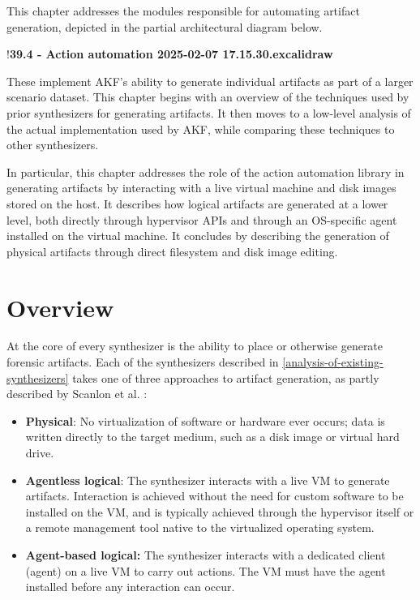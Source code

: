 This chapter addresses the modules responsible for automating artifact
generation, depicted in the partial architectural diagram below.

!\textbf{39.4 - Action automation 2025-02-07 17.15.30.excalidraw}

These implement AKF's ability to generate individual artifacts as part
of a larger scenario dataset. This chapter begins with an overview of
the techniques used by prior synthesizers for generating artifacts. It
then moves to a low-level analysis of the actual implementation used by
AKF, while comparing these techniques to other synthesizers.

In particular, this chapter addresses the role of the action automation
library in generating artifacts by interacting with a live virtual
machine and disk images stored on the host. It describes how logical
artifacts are generated at a lower level, both directly through
hypervisor APIs and through an OS-specific agent installed on the
virtual machine. It concludes by describing the generation of physical
artifacts through direct filesystem and disk image editing.

\section{Overview}\label{overview}

At the core of every synthesizer is the ability to place or otherwise
generate forensic artifacts. Each of the synthesizers described in
\autoref{analysis-of-existing-synthesizers} takes one of three approaches to artifact generation, as
partly described by Scanlon et al.
\cite{scanlonEviPlantEfficientDigital2017}:

\begin{itemize}
\tightlist
\item
  \textbf{Physical}: No virtualization of software or hardware ever
  occurs; data is written directly to the target medium, such as a disk
  image or virtual hard drive.
\item
  \textbf{Agentless logical}: The synthesizer interacts with a live VM
  to generate artifacts. Interaction is achieved without the need for
  custom software to be installed on the VM, and is typically achieved
  through the hypervisor itself or a remote management tool native to
  the virtualized operating system.
\item
  \textbf{Agent-based logical:} The synthesizer interacts with a
  dedicated client (agent) on a live VM to carry out actions. The VM
  must have the agent installed before any interaction can occur.
\end{itemize}

